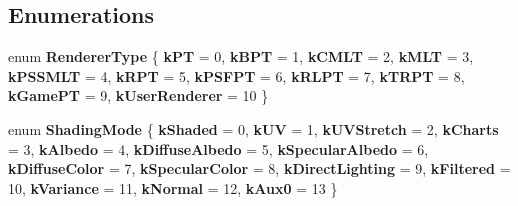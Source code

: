 \subsection*{Enumerations}
\begin{DoxyCompactItemize}
\item 
\mbox{\label{group___fermat_gae9c668e3a273ce92b9f4e134d0cbd6ce}} 
enum {\bfseries Renderer\+Type} \{ \newline
{\bfseries k\+PT} = 0, 
{\bfseries k\+B\+PT} = 1, 
{\bfseries k\+C\+M\+LT} = 2, 
{\bfseries k\+M\+LT} = 3, 
\newline
{\bfseries k\+P\+S\+S\+M\+LT} = 4, 
{\bfseries k\+R\+PT} = 5, 
{\bfseries k\+P\+S\+F\+PT} = 6, 
{\bfseries k\+R\+L\+PT} = 7, 
\newline
{\bfseries k\+T\+R\+PT} = 8, 
{\bfseries k\+Game\+PT} = 9, 
{\bfseries k\+User\+Renderer} = 10
 \}
\item 
\mbox{\label{group___fermat_ga474716bb9224d44d614704a0bd331d99}} 
enum {\bfseries Shading\+Mode} \{ \newline
{\bfseries k\+Shaded} = 0, 
{\bfseries k\+UV} = 1, 
{\bfseries k\+U\+V\+Stretch} = 2, 
{\bfseries k\+Charts} = 3, 
\newline
{\bfseries k\+Albedo} = 4, 
{\bfseries k\+Diffuse\+Albedo} = 5, 
{\bfseries k\+Specular\+Albedo} = 6, 
{\bfseries k\+Diffuse\+Color} = 7, 
\newline
{\bfseries k\+Specular\+Color} = 8, 
{\bfseries k\+Direct\+Lighting} = 9, 
{\bfseries k\+Filtered} = 10, 
{\bfseries k\+Variance} = 11, 
\newline
{\bfseries k\+Normal} = 12, 
{\bfseries k\+Aux0} = 13
 \}
\end{DoxyCompactItemize}
